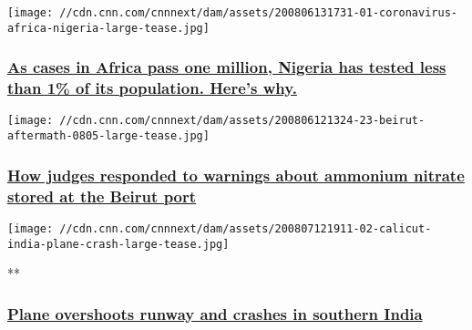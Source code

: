 \href{/2020/08/07/africa/africa-surpasses-one-million-cases-intl/index.html}{}

\texttt{[image: //cdn.cnn.com/cnnnext/dam/assets/200806131731-01-coronavirus-africa-nigeria-large-tease.jpg]}

\hypertarget{as-cases-in-africa-pass-one-million-nigeria-has-tested-less-than-1-of-its-population-heres-why-1}{%
\subsubsection{\texorpdfstring{\href{/2020/08/07/africa/africa-surpasses-one-million-cases-intl/index.html}{As
cases in Africa pass one million, Nigeria has tested less than 1\% of
its population. Here's
why.}}{As cases in Africa pass one million, Nigeria has tested less than 1\% of its population. Here's why.}}\label{as-cases-in-africa-pass-one-million-nigeria-has-tested-less-than-1-of-its-population-heres-why-1}}

\href{/2020/08/06/middleeast/lebanon-explosion-ministry-of-justice-intl/index.html}{}

\texttt{[image: //cdn.cnn.com/cnnnext/dam/assets/200806121324-23-beirut-aftermath-0805-large-tease.jpg]}

\hypertarget{how-judges-responded-to-warnings-about-ammonium-nitrate-stored-at-the-beirut-port}{%
\subsubsection{\texorpdfstring{\href{/2020/08/06/middleeast/lebanon-explosion-ministry-of-justice-intl/index.html}{How
judges responded to warnings about ammonium nitrate stored at the Beirut
port}}{How judges responded to warnings about ammonium nitrate stored at the Beirut port}}\label{how-judges-responded-to-warnings-about-ammonium-nitrate-stored-at-the-beirut-port}}

\href{/videos/world/2020/08/07/plane-crash-kozhikode-international-airport-air-india-express-vedika-sud-intl-vpx.cnn}{}

\texttt{[image: //cdn.cnn.com/cnnnext/dam/assets/200807121911-02-calicut-india-plane-crash-large-tease.jpg]}

**

\hypertarget{plane-overshoots-runway-and-crashes-in-southern-india}{%
\subsubsection{\texorpdfstring{\href{/videos/world/2020/08/07/plane-crash-kozhikode-international-airport-air-india-express-vedika-sud-intl-vpx.cnn}{Plane
overshoots runway and crashes in southern
India}}{Plane overshoots runway and crashes in southern India}}\label{plane-overshoots-runway-and-crashes-in-southern-india}}


